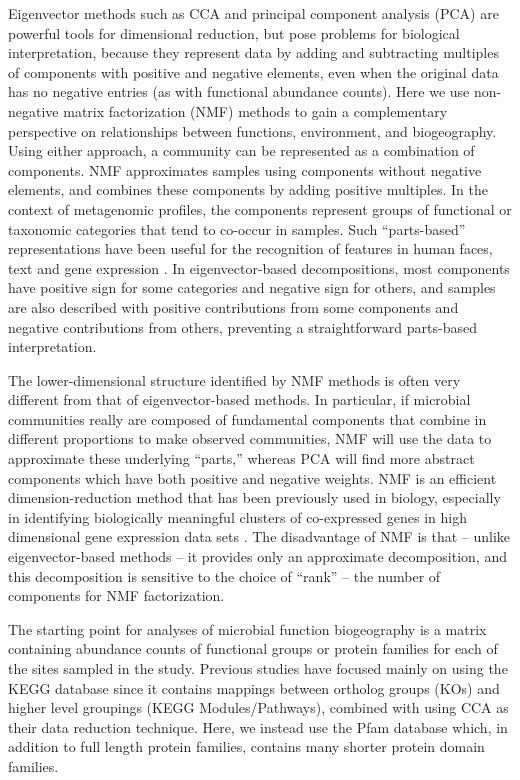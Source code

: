 Eigenvector methods such as CCA and principal component analysis (PCA) are powerful tools for dimensional reduction, but pose problems for biological interpretation, because they represent data by adding and subtracting multiples of components with positive and negative elements, even when the original data has no negative entries (as with functional abundance counts).  Here we use non-negative matrix factorization (NMF) \cite{LeeSeun99} methods to gain a complementary perspective on relationships between functions, environment, and biogeography.  Using either approach, a community can be represented as a combination of components.  NMF approximates samples using components without negative elements, and combines these components by adding positive multiples. In the context of metagenomic profiles, the components represent groups of functional or taxonomic categories that tend to co-occur in samples. Such ``parts-based'' representations have been useful for the recognition of features in human faces, text and gene expression \cite{LeeSeun99, BrunTama04}. In eigenvector-based decompositions, most components have positive sign for some categories and negative sign for others, and samples are also described with positive contributions from some components and negative contributions from others, preventing a straightforward parts-based interpretation.

The lower-dimensional structure identified by NMF methods is often very different from that of eigenvector-based methods. In particular, if microbial communities really are composed of fundamental components that combine in different proportions to make observed communities, NMF will use the data to approximate these underlying ``parts,'' whereas PCA will find more abstract components which have both positive and negative weights.  NMF is an efficient dimension-reduction method that has been previously used in biology, especially in identifying biologically meaningful clusters of co-expressed genes in high dimensional gene expression data sets \cite{KimTido03,BrunTama04,Deva08}.  The disadvantage of NMF is that -- unlike eigenvector-based methods -- it provides only an approximate decomposition, and this decomposition is sensitive to the choice of ``rank'' -- the number of components for NMF factorization.


The starting point for analyses of microbial function biogeography is a matrix containing abundance counts of functional groups or protein families for each of the sites sampled in the study. Previous studies have focused mainly on using the KEGG \cite{KaneGoto10} database since it contains mappings between ortholog groups (KOs) and higher level groupings (KEGG Modules/Pathways), combined with using CCA as their data reduction technique.  Here, we instead use the Pfam database \cite{FinnMist10} which, in addition to full length protein families, contains many shorter protein domain families.

